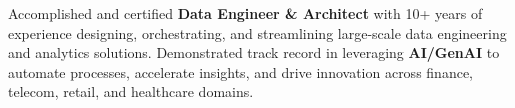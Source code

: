 \vspace*{-0.5cm} %

\begin{cvparagraph}
{\fontsize{11pt}{1em}\selectfont Accomplished and certified \textbf{Data Engineer \& Architect} with 10+ years of experience designing, orchestrating, and streamlining large-scale data engineering and analytics solutions. Demonstrated track record in leveraging \textbf{AI/GenAI} to automate processes, accelerate insights, and drive innovation across finance, telecom, retail, and healthcare domains.}
\end{cvparagraph}

\vspace{6pt}
